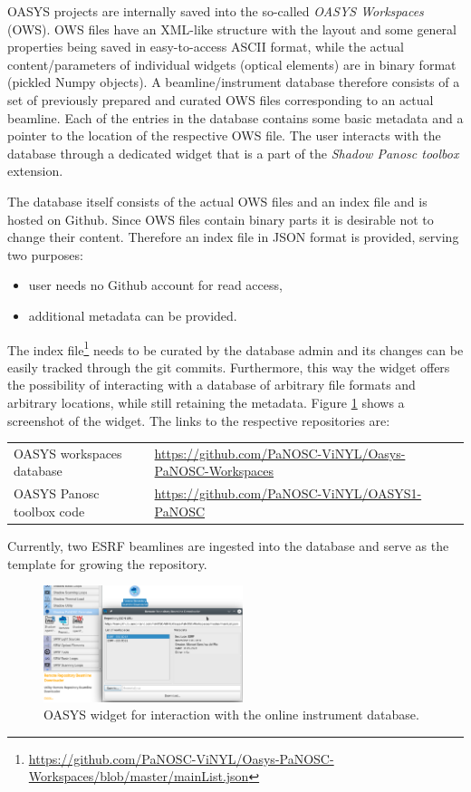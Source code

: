\documentclass[10pt]{scrartcl}
\begin{document}
OASYS projects are internally saved into the so-called \emph{OASYS Workspaces} (OWS). OWS files have an XML-like structure with the layout and some general properties being saved in easy-to-access ASCII format, while the actual content/parameters of individual widgets (optical elements) are in binary format (pickled Numpy objects). A beamline/instrument database therefore consists of a set of previously prepared and curated OWS files corresponding to an actual beamline. Each of the entries in the database contains some basic metadata and a pointer to the location of the respective OWS file. The user interacts with the database through a dedicated widget that is a part of the \emph{Shadow Panosc toolbox} extension.

The database itself consists of the actual OWS files and an index file and is hosted on Github. Since OWS files contain binary parts it is desirable not to change their content. Therefore an index file in JSON format is provided, serving two purposes:
\begin{itemize}
    \item user needs no Github account for read access,
    \item additional metadata can be provided.
\end{itemize}

The index file\footnote{\url{https://github.com/PaNOSC-ViNYL/Oasys-PaNOSC-Workspaces/blob/master/mainList.json}} needs to be curated by the database admin and its changes can be easily tracked through the git commits. Furthermore, this way the widget offers the possibility of interacting with a database of arbitrary file formats and arbitrary locations, while still retaining the metadata. Figure \ref{fig:oasys_database} shows a screenshot of the widget. The links to the respective repositories are:

\begin{center}
\begin{tabular}{l l}
OASYS workspaces database & \url{https://github.com/PaNOSC-ViNYL/Oasys-PaNOSC-Workspaces} \\
OASYS Panosc toolbox code & \url{https://github.com/PaNOSC-ViNYL/OASYS1-PaNOSC} 
\end{tabular}
\end{center}

Currently, two ESRF beamlines are ingested into the database and serve as the template for growing the repository.

\begin{figure}[htb]
    \centering
    \includegraphics[width=0.52\textwidth]{figures/oasys_database_widget.png}
    \caption{OASYS widget for interaction with the online instrument database.}
    \label{fig:oasys_database}
\end{figure}
\end{document}
